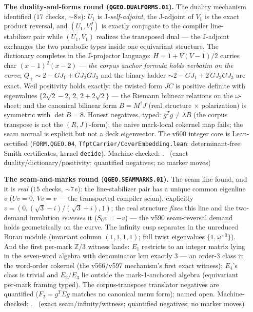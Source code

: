 \documentclass[11pt,a4paper]{article}
\theoremstyle{definition}
\begin{document}
\par\smallskip\noindent\textbf{The duality-and-forms round
(\texttt{QGEO.DUALFORMS.01}).}
The duality mechanism identified ($17$ checks, ${\sim}8$\,s): $U_1$
is J-\emph{self-adjoint}, the J-adjoint of $V_1$ is the exact product
reversal, and $(U_1,V_1^J)$ is exactly conjugate to the compiler
line-stabilizer pair while $(U_1,V_1)$ realizes the transposed dual
--- the J-adjoint exchanges the two parabolic types inside one
equivariant structure.  The dictionary completes in the J-projector
language: $H=1+V(V-1)/2$ carries char $(x-1)^2(x-2)$ --- \emph{the
corpus anchor formula holds verbatim on the curve}; $Q_+\sim
2-GJ_1+GJ_2GJ_3$ and the binary ladder $\sim 2-GJ_1+2\,GJ_2GJ_3$ are
exact.  Weil positivity holds exactly: the twisted form $JC$ is
positive definite with eigenvalues $\{2\sqrt2-2,\,2,\,2+2\sqrt2\}$
--- the Riemann bilinear relations on the $\omega$-sheet; and the
canonical bilinear form $B=M^\dagger J$ (real structure $\times$
polarization) is symmetric with $\det B=8$.  Honest negatives, typed:
$g^Tg\ne\lambda B$ (the corpus transpose is not the $(R,J)$-form);
the naive mark-local cokernel map fails; the seam normal is explicit
but not a deck eigenvector.  The v600 integer core is Lean-certified
(\texttt{FORM.QGEO.04}, \texttt{TfptCarrier/CoverEmbedding.lean}:
determinant-free Smith certificates, kernel \texttt{decide}).
Machine-checked: .
\mE\ (exact duality/dictionary/positivity; quantified negatives; no
marker moves)
\par\smallskip

\par\smallskip\noindent\textbf{The seam-and-marks round
(\texttt{QGEO.SEAMMARKS.01}).}
The seam line found, and it is \emph{real} ($15$ checks, ${\sim}7$\,s):
the line-stabilizer pair has a unique common eigenline $v$ ($Uv=0$,
$Vv=v$ --- the transported compiler seam), explicitly
$v=(0,(\sqrt3-i)/(\sqrt3+i),1)$; the real structure \emph{fixes} this
line and the two-demand involution \emph{reverses} it ($S_0v=-v$) ---
the v590 seam-reversal demand holds geometrically on the curve.  The
infinity cusp separates in the unreduced Burau module (invariant
column $(1,1,1,1)$; full twist eigenvalues $\{1,\omega^{\times3}\}$).
And the first per-mark $\mathbb{Z}/3$ witness lands: $E_1$ restricts
to an integer matrix lying in the seven-word algebra with
denominator lcm exactly $3$ --- an order-$3$ class in the word-order
cokernel (the v566/v597 mechanism's first exact witness); $E_4$'s
class is trivial and $E_2/E_3$ lie outside the mark-1-anchored
algebra (equivariant per-mark framing typed).  The corpus-transpose
translator negatives are quantified ($F_2=g^T\Sigma g$ matches no
canonical menu form); named open.
Machine-checked: .
\mE\ (exact seam/infinity/witness; quantified negatives; no marker
moves)
\par\smallskip
\end{document}
